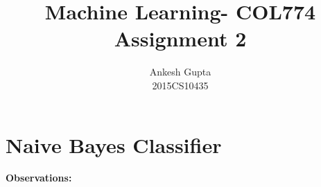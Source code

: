 \documentclass{article}
\newcommand{\bld}[1]{\textbf{#1}}
\newcommand{\ital}[1]{\textit{#1}}
\begin{document}
\title{Machine Learning- COL774 \\Assignment 2}
\author{Ankesh Gupta\\2015CS10435}

\date{}
\maketitle

\section*{Naive Bayes Classifier}

\bld{Observations:}
\end{document}
